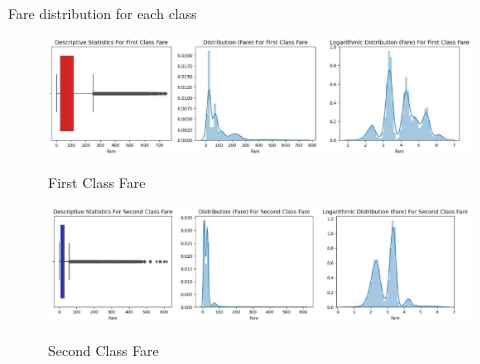 \documentclass[
size=14pt,
paper=smartboard,  %
mode=present, 		%
display=slides, 	%
style=tuliplab,  	%
pauseslide,
fleqn,leqno]{powerdot}
\begin{document}
	
	\begin{slide}[toc=,bm=]{Fare distribution for each class}
		\vspace{-1cm}
		\begin{figure}
			\centering
			\includegraphics[width=1\textwidth]{figures//fig2.eps}\\
			\vspace{-0.4cm}
			\caption{First Class Fare}
		\end{figure}
		\vspace{-1.2cm}
		\begin{figure}
			\centering
			\includegraphics[width=1\textwidth]{figures//fig3.eps}\\
			\vspace{-0.4cm}
			\caption{Second Class Fare}
		\end{figure}
	\end{slide}
	
\end{document}

